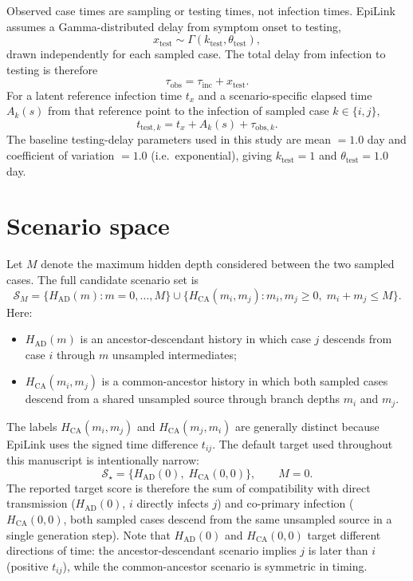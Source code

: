 \documentclass[11pt,a4paper]{article}
\begin{document}
Observed case times are sampling or testing times, not infection times. EpiLink assumes a Gamma-distributed delay from symptom onset to testing,
\[
x_{\mathrm{test}} \sim \Gamma(k_{\mathrm{test}}, \theta_{\mathrm{test}}),
\]
drawn independently for each sampled case. The total delay from infection to testing is therefore
\[
\tau_{\mathrm{obs}} = \tau_{\mathrm{inc}} + x_{\mathrm{test}}.
\]
For a latent reference infection time $t_x$ and a scenario-specific elapsed time $A_k(s)$ from that reference point to the infection of sampled case $k \in \{i, j\}$,
\[
t_{\mathrm{test},k} = t_x + A_k(s) + \tau_{\mathrm{obs},k}.
\]
The baseline testing-delay parameters used in this study are mean $= 1.0$ day and coefficient of variation $= 1.0$ (i.e.\ exponential), giving $k_{\mathrm{test}} = 1$ and $\theta_{\mathrm{test}} = 1.0$ day.

\section{Scenario space}
\label{sec:S1_scenarios}

Let $M$ denote the maximum hidden depth considered between the two sampled cases. The full candidate scenario set is
\[
\mathcal{S}_M =
\bigl\{H_{\mathrm{AD}}(m): m = 0,\ldots,M\bigr\}
\cup
\bigl\{H_{\mathrm{CA}}(m_i,m_j): m_i,m_j \ge 0,\; m_i+m_j \le M\bigr\}.
\]
Here:
\begin{itemize}
  \item $H_{\mathrm{AD}}(m)$ is an ancestor-descendant history in which case $j$ descends from case $i$ through $m$ unsampled intermediates;
  \item $H_{\mathrm{CA}}(m_i,m_j)$ is a common-ancestor history in which both sampled cases descend from a shared unsampled source through branch depths $m_i$ and $m_j$.
\end{itemize}

The labels $H_{\mathrm{CA}}(m_i,m_j)$ and $H_{\mathrm{CA}}(m_j,m_i)$ are generally distinct because EpiLink uses the signed time difference $t_{ij}$. The default target used throughout this manuscript is intentionally narrow:
\[
\mathcal{S}_\star = \bigl\{H_{\mathrm{AD}}(0),\; H_{\mathrm{CA}}(0,0)\bigr\}, \qquad M = 0.
\]
The reported target score is therefore the sum of compatibility with direct transmission ($H_{\mathrm{AD}}(0)$, $i$ directly infects $j$) and co-primary infection ($H_{\mathrm{CA}}(0,0)$, both sampled cases descend from the same unsampled source in a single generation step). Note that $H_{\mathrm{AD}}(0)$ and $H_{\mathrm{CA}}(0,0)$ target different directions of time: the ancestor-descendant scenario implies $j$ is later than $i$ (positive $t_{ij}$), while the common-ancestor scenario is symmetric in timing.
\end{document}
